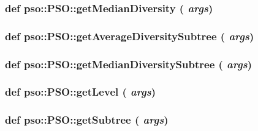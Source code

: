 \hypertarget{classpso_1_1PSO_dc2ade6c497fad83633c2b63ad8a385d}{
\subsubsection{\setlength{\rightskip}{0pt plus 5cm}def pso::PSO::getMedianDiversity ( {\em args})}}
\label{classpso_1_1PSO_dc2ade6c497fad83633c2b63ad8a385d}


\hypertarget{classpso_1_1PSO_56c6f87ef898eb6d92d6a7220d8b33d9}{
\subsubsection{\setlength{\rightskip}{0pt plus 5cm}def pso::PSO::getAverageDiversitySubtree ( {\em args})}}
\label{classpso_1_1PSO_56c6f87ef898eb6d92d6a7220d8b33d9}


\hypertarget{classpso_1_1PSO_3589981e41f1d2daafd0b65f2e6561c6}{
\subsubsection{\setlength{\rightskip}{0pt plus 5cm}def pso::PSO::getMedianDiversitySubtree ( {\em args})}}
\label{classpso_1_1PSO_3589981e41f1d2daafd0b65f2e6561c6}


\hypertarget{classpso_1_1PSO_bbaf7370958d0a4f8f86f88191fe8d7b}{
\subsubsection{\setlength{\rightskip}{0pt plus 5cm}def pso::PSO::getLevel ( {\em args})}}
\label{classpso_1_1PSO_bbaf7370958d0a4f8f86f88191fe8d7b}


\hypertarget{classpso_1_1PSO_7739fcbeaef55dfe76916f3088af860f}{
\subsubsection{\setlength{\rightskip}{0pt plus 5cm}def pso::PSO::getSubtree ( {\em args})}}
\label{classpso_1_1PSO_7739fcbeaef55dfe76916f3088af860f}


